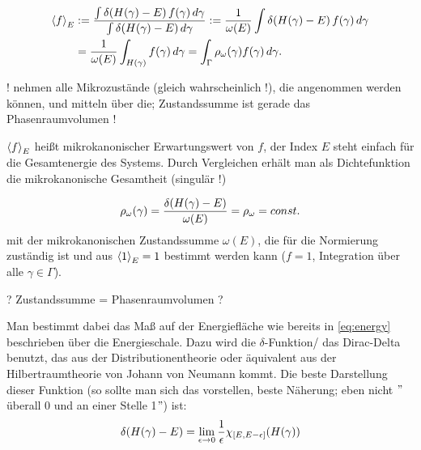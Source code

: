 \documentclass[../KlassMech_main.tex]{subfiles}
\begin{document}
\begin{align}\label{eq:microzust}
\expval{f}_E &:= %
\frac{\int \delta\qty(H(\gamma) - E) \, f(\gamma) \, d\gamma}{\int \delta\qty(H(\gamma) - E) \, d\gamma} := \frac{1}{\omega(E)} \int \delta\qty(H(\gamma) - E) \, f(\gamma) \, d\gamma
\\
&= \frac{1}{\omega(E)} \int_{H(\gamma)} f(\gamma) \, d\gamma = \int_\Gamma \rho_\omega(\gamma) f(\gamma) \, d\gamma \notag .
\end{align}

! nehmen alle Mikrozustände (gleich wahrscheinlich !), die angenommen werden können, und mitteln über die; Zustandssumme ist gerade das Phasenraumvolumen !

$\expval{f}_E$ heißt mikrokanonischer Erwartungswert von $f$, der Index $E$ steht einfach für die Gesamtenergie des Systems. Durch Vergleichen erhält man als Dichtefunktion die mikrokanonische Gesamtheit (singulär !)

\begin{equation}\label{eq:dichtef}
\rho_\omega(\gamma) = \frac{\delta\qty(H\qty(\gamma) - E)}{\omega(E)} = \rho_\omega = const.
\end{equation}
mit der mikrokanonischen Zustandssumme $\omega(E)$, die für die Normierung zuständig ist und aus $\expval{1}_E = 1$ bestimmt werden kann ($f = 1$, Integration über alle $\gamma \in \Gamma$).


? Zustandssumme = Phasenraumvolumen ?


Man bestimmt dabei das Maß auf der Energiefläche wie bereits in \eqref{eq:energy} beschrieben über die Energieschale. Dazu wird die $\delta$-Funktion/ das Dirac-Delta benutzt, das aus der Distributionentheorie oder äquivalent aus der Hilbertraumtheorie von Johann von Neumann kommt. Die beste Darstellung dieser Funktion (so sollte man sich das vorstellen, beste Näherung; eben nicht $"$überall 0 und an einer Stelle 1$"$) ist:
\begin{equation}
\delta\qty(H(\gamma) - E) = \lim_{\epsilon \rightarrow 0} \frac{1}{\epsilon} \chi_{[E, E-\epsilon]}\qty(H(\gamma))
\end{equation}
\end{document}
